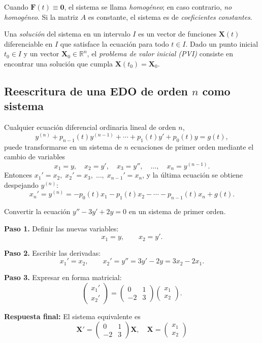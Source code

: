 Cuando $\mathbf{F}(t)\equiv \mathbf{0}$, el sistema se llama \emph{homogéneo}; en caso contrario, \emph{no homogéneo}. Si la matriz $A$ es constante, el sistema es de \emph{coeficientes constantes}.

\begin{definition}
Una \emph{solución} del sistema en un intervalo $I$ es un vector de funciones $\mathbf{X}(t)$ diferenciable en $I$ que satisface la ecuación para todo $t\in I$. Dado un punto inicial $t_0\in I$ y un vector $\mathbf{X}_0\in\mathbb{R}^n$, el \emph{problema de valor inicial (PVI)} consiste en encontrar una solución que cumpla $\mathbf{X}(t_0)=\mathbf{X}_0$.
\end{definition}

\subsection{Reescritura de una EDO de orden $n$ como sistema}

Cualquier ecuación diferencial ordinaria lineal de orden $n$,
\[
y^{(n)}+p_{n-1}(t)y^{(n-1)}+\cdots+p_1(t)y'+p_0(t)y=g(t),
\]
puede transformarse en un sistema de $n$ ecuaciones de primer orden mediante el cambio de variables
\[
x_1=y,\quad x_2=y',\quad x_3=y'',\quad \dots,\quad x_n=y^{(n-1)}.
\]
Entonces $x_1'=x_2,\; x_2'=x_3,\;\dots,\; x_{n-1}'=x_n$, y la última ecuación se obtiene despejando $y^{(n)}$:
\[
x_n'=y^{(n)}=-p_0(t)x_1-p_1(t)x_2-\cdots-p_{n-1}(t)x_n+g(t).
\]

\begin{example}
Convertir la ecuación $y''-3y'+2y=0$ en un sistema de primer orden.
\begin{myproof}
\textbf{Paso 1.} Definir las nuevas variables:
\[
x_1=y,\qquad x_2=y'.
\]

\textbf{Paso 2.} Escribir las derivadas:
\[
x_1'=x_2,\qquad x_2'=y''=3y'-2y=3x_2-2x_1.
\]

\textbf{Paso 3.} Expresar en forma matricial:
\[
\begin{pmatrix}
x_1'\\x_2'
\end{pmatrix}
=
\begin{pmatrix}
0&1\\
-2&3
\end{pmatrix}
\begin{pmatrix}
x_1\\x_2
\end{pmatrix}.
\]

\textbf{Respuesta final:} El sistema equivalente es
\[
\boxed{
\mathbf{X}'=
\begin{pmatrix}
0&1\\
-2&3
\end{pmatrix}
\mathbf{X},\quad
\mathbf{X}=
\begin{pmatrix}
x_1\\x_2
\end{pmatrix}
}
\]
\end{myproof}
\end{example}

